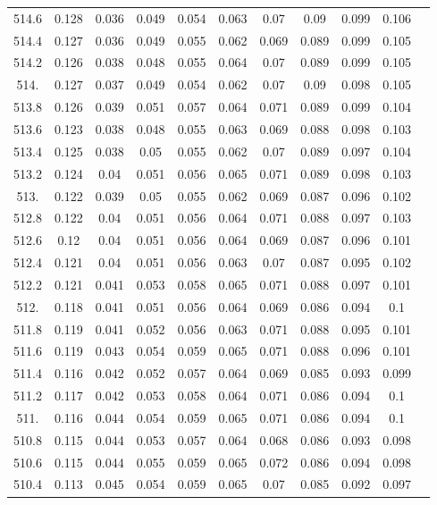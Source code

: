 \documentclass[12pt]{ctexart}
\numberwithin{equation}{section}
\begin{document}
\begin{longtable}{ccccccccccc}
514.6	&	0.128	&	0.036	&	0.049	&	0.054	&	0.063	&	0.07	&	0.09	&	0.099	&	0.106	\\
514.4	&	0.127	&	0.036	&	0.049	&	0.055	&	0.062	&	0.069	&	0.089	&	0.099	&	0.105	\\
514.2	&	0.126	&	0.038	&	0.048	&	0.055	&	0.064	&	0.07	&	0.089	&	0.099	&	0.105	\\
514.	&	0.127	&	0.037	&	0.049	&	0.054	&	0.062	&	0.07	&	0.09	&	0.098	&	0.105	\\
513.8	&	0.126	&	0.039	&	0.051	&	0.057	&	0.064	&	0.071	&	0.089	&	0.099	&	0.104	\\
513.6	&	0.123	&	0.038	&	0.048	&	0.055	&	0.063	&	0.069	&	0.088	&	0.098	&	0.103	\\
513.4	&	0.125	&	0.038	&	0.05	&	0.055	&	0.062	&	0.07	&	0.089	&	0.097	&	0.104	\\
513.2	&	0.124	&	0.04	&	0.051	&	0.056	&	0.065	&	0.071	&	0.089	&	0.098	&	0.103	\\
513.	&	0.122	&	0.039	&	0.05	&	0.055	&	0.062	&	0.069	&	0.087	&	0.096	&	0.102	\\
512.8	&	0.122	&	0.04	&	0.051	&	0.056	&	0.064	&	0.071	&	0.088	&	0.097	&	0.103	\\
512.6	&	0.12	&	0.04	&	0.051	&	0.056	&	0.064	&	0.069	&	0.087	&	0.096	&	0.101	\\
512.4	&	0.121	&	0.04	&	0.051	&	0.056	&	0.063	&	0.07	&	0.087	&	0.095	&	0.102	\\
512.2	&	0.121	&	0.041	&	0.053	&	0.058	&	0.065	&	0.071	&	0.088	&	0.097	&	0.101	\\
512.	&	0.118	&	0.041	&	0.051	&	0.056	&	0.064	&	0.069	&	0.086	&	0.094	&	0.1	\\
511.8	&	0.119	&	0.041	&	0.052	&	0.056	&	0.063	&	0.071	&	0.088	&	0.095	&	0.101	\\
511.6	&	0.119	&	0.043	&	0.054	&	0.059	&	0.065	&	0.071	&	0.088	&	0.096	&	0.101	\\
511.4	&	0.116	&	0.042	&	0.052	&	0.057	&	0.064	&	0.069	&	0.085	&	0.093	&	0.099	\\
511.2	&	0.117	&	0.042	&	0.053	&	0.058	&	0.064	&	0.071	&	0.086	&	0.094	&	0.1	\\
511.	&	0.116	&	0.044	&	0.054	&	0.059	&	0.065	&	0.071	&	0.086	&	0.094	&	0.1	\\
510.8	&	0.115	&	0.044	&	0.053	&	0.057	&	0.064	&	0.068	&	0.086	&	0.093	&	0.098	\\
510.6	&	0.115	&	0.044	&	0.055	&	0.059	&	0.065	&	0.072	&	0.086	&	0.094	&	0.098	\\
510.4	&	0.113	&	0.045	&	0.054	&	0.059	&	0.065	&	0.07	&	0.085	&	0.092	&	0.097	\\

\end{longtable}
\end{document}
